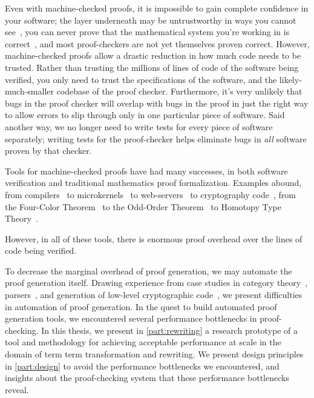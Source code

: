 Even with machine-checked proofs, it is impossible to gain complete confidence in your software; the layer underneath may be untrustworthy in ways you cannot see~\cite{Reflections1984Thompson}, you can never prove that the mathematical system you're working in is correct~\cite{sep-goedel-incompleteness}, and most proof-checkers are not yet themselves proven correct.
However, machine-checked proofs allow a drastic reduction in how much code needs to be trusted.
Rather than trusting the millions of lines of code of the software being verified, you only need to trust the specifications of the software, and the likely-much-smaller codebase of the proof checker.
Furthermore, it's very unlikely that bugs in the proof checker will overlap with bugs in the proof in just the right way to allow errors to slip through only in one particular piece of software.
Said another way, we no longer need to write tests for every piece of software separately; writing tests for the proof-checker helps eliminate bugs in \emph{all} software proven by that checker.


Tools for machine-checked proofs have had many successes, in both software verification and traditional mathematics proof formalization.
Examples abound, from compilers~\cite{Compcert} to microkernels~\cite{seL4SOSP09} to web-servers~\cite{Network2015Chlipala} to cryptography code~\cite{FiatCryptoSP19}, from the Four-Color Theorem~\cite{gonthier2008formal} to the Odd-Order Theorem~\cite{gonthier2013machine} to Homotopy Type Theory~\cite{HoTTBook}.

However, in all of these tools, there is enormous proof overhead over the lines of code being verified.

To decrease the marginal overhead of proof generation, we may automate the proof generation itself.
Drawing experience from case studies in category theory~\cite{category-coq-experience}, parsers~\cite{jgross-masters-thesis}, and generation of low-level cryptographic code~\cite{FiatCryptoSP19}, we present difficulties in automation of proof generation.
In the quest to build automated proof generation tools, we encountered several performance bottlenecks in proof-checking.
In this thesis, we present in \autoref{part:rewriting} a research prototype of a tool and methodology for achieving acceptable performance at scale in the domain of term term transformation and rewriting.
We present design principles in \autoref{part:design} to avoid the performance bottlenecks we encountered, and insights about the proof-checking system that these performance bottlenecks reveal.



